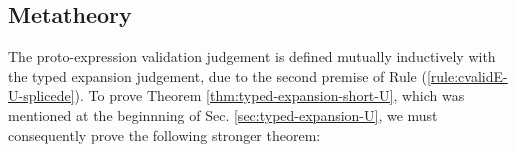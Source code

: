 




\subsection{Metatheory}\label{sec:SE-metatheory}
The proto-expression validation judgement is defined mutually inductively with the typed expansion judgement, due to the second premise of Rule (\ref{rule:cvalidE-U-splicede}). To prove Theorem \ref{thm:typed-expansion-short-U}, which was mentioned at the beginnning of Sec. \ref{sec:typed-expansion-U}, we must consequently prove the following stronger theorem:

